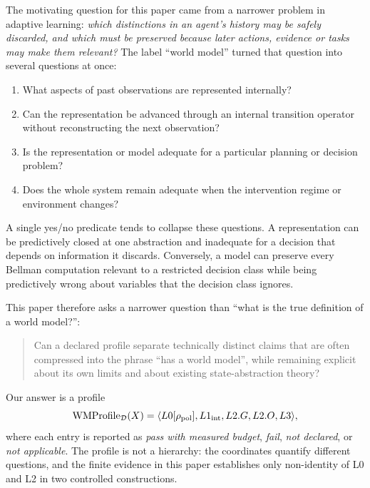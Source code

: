 \documentclass[10pt]{article}
\newcommand{\WMProfile}{\mathrm{WMProfile}}
\begin{document}
The motivating question for this paper came from a narrower problem in adaptive learning: \emph{which distinctions in an agent's history may be safely discarded, and which must be preserved because later actions, evidence or tasks may make them relevant?} The label ``world model'' turned that question into several questions at once:
\begin{enumerate}
    \item What aspects of past observations are represented internally?
    \item Can the representation be advanced through an internal transition operator without reconstructing the next observation?
    \item Is the representation or model adequate for a particular planning or decision problem?
    \item Does the whole system remain adequate when the intervention regime or environment changes?
\end{enumerate}
A single yes/no predicate tends to collapse these questions. A representation can be predictively closed at one abstraction and inadequate for a decision that depends on information it discards. Conversely, a model can preserve every Bellman computation relevant to a restricted decision class while being predictively wrong about variables that the decision class ignores.

This paper therefore asks a narrower question than ``what is the true definition of a world model?'':
\begin{quote}
Can a declared profile separate technically distinct claims that are often compressed into the phrase ``has a world model'', while remaining explicit about its own limits and about existing state-abstraction theory?
\end{quote}

Our answer is a profile
\[
\WMProfile_{\mathcal D}(X)
=
\langle L0[\rho_{\rm pol}],L1_{\rm int},L2.G,L2.O,L3\rangle,
\]
where each entry is reported as \emph{pass with measured budget}, \emph{fail}, \emph{not declared}, or \emph{not applicable}. The profile is not a hierarchy: the coordinates quantify different questions, and the finite evidence in this paper establishes only non-identity of L0 and L2 in two controlled constructions.
\end{document}
